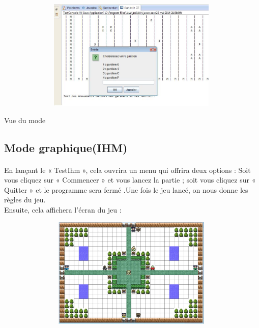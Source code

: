 \begin{center}
\includegraphics[height=200, width=500]{images/console.jpg}
\end{center}
\label{}Vue du mode 
\subsection{Mode graphique(IHM)}

\paragraph{}En lançant le « TestIhm », cela ouvrira un menu qui offrira deux options : Soit vous cliquez sur « Commencer » et vous lancez la partie ; soit vous cliquez sur « Quitter » et le programme sera fermé .Une fois le jeu lancé, on nous donne les règles du jeu. \\
Ensuite, cela affichera l’écran du jeu :
 
\includegraphics[height=200, width=500]{images/ihm.jpg}


